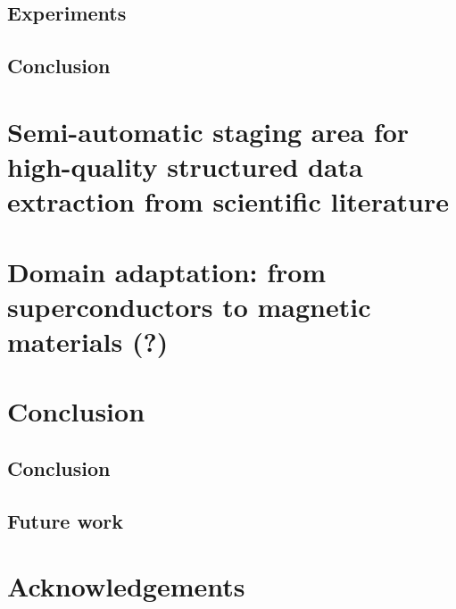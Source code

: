 \documentclass[12pt, a4paper]{report}
\begin{document}
\section{Experiments}
\section{Conclusion}

\chapter{Semi-automatic staging area for high-quality structured data extraction from scientific literature}

\chapter{Domain adaptation: from superconductors to magnetic materials (?)}

\chapter{Conclusion}
\section{Conclusion}
\section{Future work}

\chapter*{Acknowledgements}
\newpage



\end{document}
